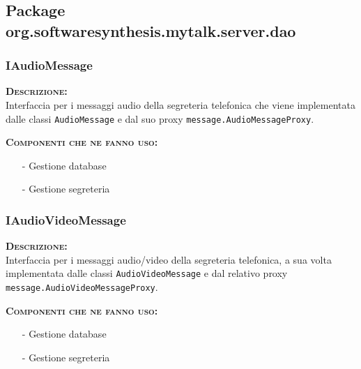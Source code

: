 \subsection{Package org.softwaresynthesis.mytalk.server.dao}

\subsubsection{IAudioMessage}
\begin{description}
	\item{\scshape\bfseries Descrizione:}\\
Interfaccia per i messaggi audio della segreteria telefonica che viene implementata dalle classi \texttt{AudioMessage} e dal suo proxy \texttt{message.AudioMessageProxy}.
	\item{\scshape\bfseries Componenti che ne fanno uso:}
	  \begin{itemize}[noitemsep,nolistsep]
	  \item[-] Gestione database
	  \item[-] Gestione segreteria
	  \end{itemize}
\end{description}

\subsubsection{IAudioVideoMessage}
\begin{description}
	\item{\scshape\bfseries Descrizione:}\\
Interfaccia per i messaggi audio/video della segreteria telefonica, a sua volta implementata dalle classi \texttt{AudioVideoMessage} e dal relativo proxy \texttt{message.AudioVideoMessageProxy}.
	\item{\scshape\bfseries Componenti che ne fanno uso:} 
	  \begin{itemize}[noitemsep,nolistsep]
	    \item[-] Gestione database
	    \item[-] Gestione segreteria
	  \end{itemize}
\end{description}

